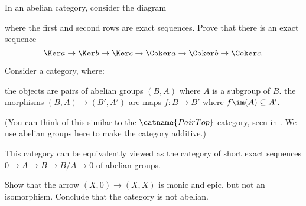 \begin{sproblem}
	\onechili
	In an abelian category, consider the diagram
	\begin{center}
	\end{center}
	where the first and second rows are exact sequences.
	Prove that there is an exact sequence
	\[ \Ker a \to \Ker b \to \Ker c \to \Coker a \to \Coker b \to \Coker c. \]
\end{sproblem}

\begin{problem}
	Consider a category, where:
	\begin{itemize}
		\ii the objects are pairs of abelian groups $(B, A)$ where $A$ is a subgroup of $B$.
		\ii the morphisms $(B, A) \to (B', A')$ are maps $f \colon B \to B'$ where
		$f\im(A) \subseteq A'$.
	\end{itemize}
	(You can think of this similar to the $\catname{PairTop}$ category, seen in
	. We use abelian groups here to make the category additive.)

	This category can be equivalently viewed as the category of short exact sequences
	$0 \to A \to B \to B/A \to 0$ of abelian groups.

	Show that the arrow $(X, 0) \to (X, X)$ is monic and epic, but not an
	isomorphism. Conclude that the category is not abelian.
\end{problem}
